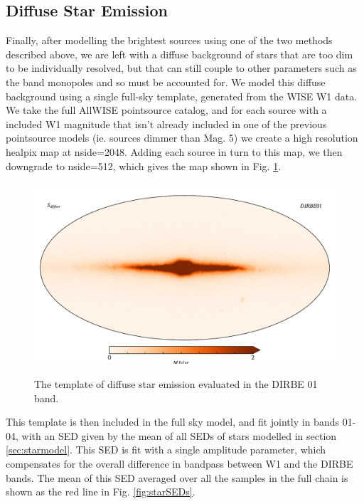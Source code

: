 \documentclass{aa}
\begin{document}
\subsection{Diffuse Star Emission}

\label{sec:diffusemodel}

Finally, after modelling the brightest sources using one of the two methods described above, we are left with a diffuse background of stars that are too dim to be individually resolved, but that can still couple to other parameters such as the band monopoles and so must be accounted for. We model this diffuse background using a single full-sky template, generated from the WISE W1 data. We take the full AllWISE pointsource catalog, and for each source with a included W1 magnitude that isn't already included in one of the previous pointsource models (ie. sources dimmer than Mag. 5) we create a high resolution healpix map \citep{healpix} at nside=2048. Adding each source in turn to this map, we then downgrade to nside=512, which gives the map shown in Fig. \ref{fig:diffuse}. 

\begin{figure}
  \centering
  \includegraphics[width=\columnwidth]{figs/diffuseTemplate/diffuse_stars.pdf}\\
  \caption{The template of diffuse star emission evaluated in the DIRBE 01 band.}
  \label{fig:diffuse}
\end{figure}

This template is then included in the full sky model, and fit jointly in bands 01-04, with an SED given by the mean of all SEDs of stars modelled in section \ref{sec:starmodel}. This SED is fit with a single amplitude parameter, which compensates for the overall difference in bandpass between W1 and the DIRBE bands. The mean of this SED averaged over all the samples in the full chain is shown as the red line in Fig. \ref{fig:starSEDs}.
\end{document}
